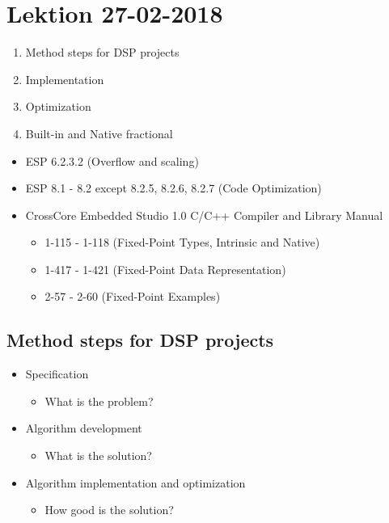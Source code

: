 \section{Lektion 27-02-2018}

\begin{enumerate}
	\item Method steps for DSP projects
	\item Implementation
	\item Optimization
	\item Built-in and Native fractional
\end{enumerate}

\begin{mdframed}[style=exampledefault]
\begin{itemize}
	\item ESP 6.2.3.2 (Overflow and scaling)
	\item ESP 8.1 - 8.2 except 8.2.5, 8.2.6, 8.2.7 (Code Optimization)
	\item CrossCore Embedded Studio 1.0 C/C++ Compiler and Library Manual
	\begin{itemize}
		\item 1-115 - 1-118 (Fixed-Point Types, Intrinsic and Native)
		\item 1-417 - 1-421 (Fixed-Point Data Representation)
		\item 2-57 - 2-60  (Fixed-Point Examples)
	\end{itemize}
\end{itemize}
\end{mdframed}

\subsection{Method steps for DSP projects}
\begin{itemize}
	\item Specification
	\begin{itemize}
		\item What is the problem?
	\end{itemize}
	\item Algorithm	development
	\begin{itemize}
		\item What is the solution?
	\end{itemize} 
	\item Algorithm	implementation and optimization
	\begin{itemize}
		\item How good is the solution?
	\end{itemize}
\end{itemize}

